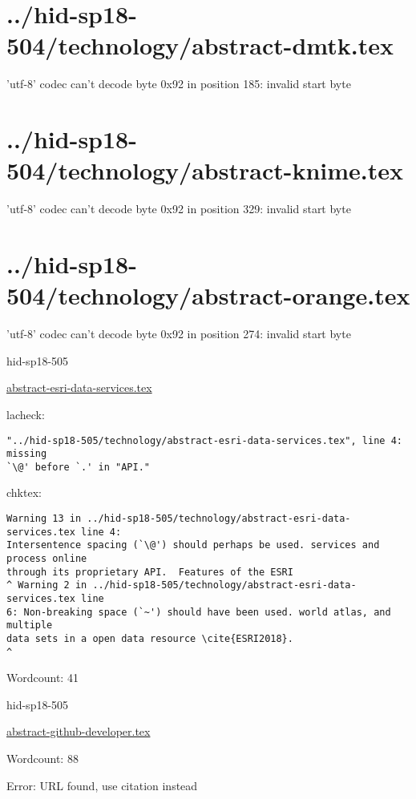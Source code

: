 \section{../hid-sp18-504/technology/abstract-dmtk.tex}
'utf-8' codec can't decode byte 0x92 in position 185: invalid start byte
\section{../hid-sp18-504/technology/abstract-knime.tex}
'utf-8' codec can't decode byte 0x92 in position 329: invalid start byte
\section{../hid-sp18-504/technology/abstract-orange.tex}
'utf-8' codec can't decode byte 0x92 in position 274: invalid start byte


\begin{IU}

hid-sp18-505

\href{https://github.com/cloudmesh-community/hid-sp18-505/blob/master//technology/abstract-esri-data-services.tex}{abstract-esri-data-services.tex}

 
lacheck:
\begin{tiny}
\begin{verbatim}
"../hid-sp18-505/technology/abstract-esri-data-services.tex", line 4: missing
`\@' before `.' in "API."
\end{verbatim}
\end{tiny}
chktex:
\begin{tiny}
\begin{verbatim}
Warning 13 in ../hid-sp18-505/technology/abstract-esri-data-services.tex line 4:
Intersentence spacing (`\@') should perhaps be used. services and process online
through its proprietary API.  Features of the ESRI
^ Warning 2 in ../hid-sp18-505/technology/abstract-esri-data-services.tex line
6: Non-breaking space (`~') should have been used. world atlas, and multiple
data sets in a open data resource \cite{ESRI2018}.
^
\end{verbatim}
\end{tiny}

Wordcount: 41

\end{IU}



\begin{IU}

hid-sp18-505

\href{https://github.com/cloudmesh-community/hid-sp18-505/blob/master//technology/abstract-github-developer.tex}{abstract-github-developer.tex}

 

Wordcount: 88

Error: URL found, use citation instead
\end{IU}


